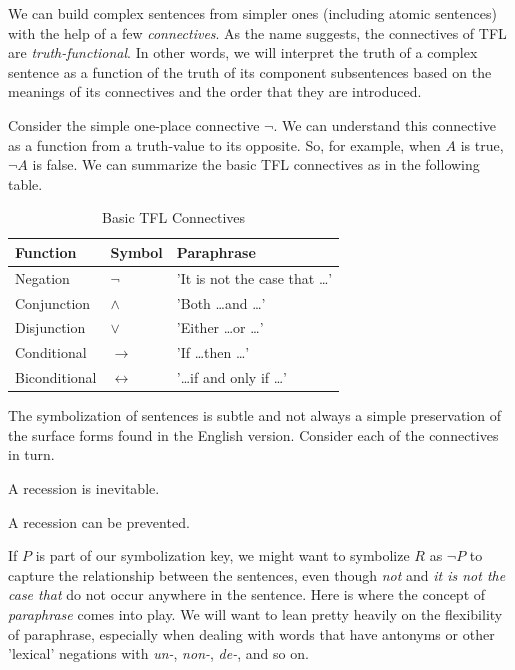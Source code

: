 We can build complex sentences from simpler ones (including atomic sentences)
with the help of a few \emph{connectives}. As the name suggests, the
connectives of TFL are \emph{truth-functional}. In other words, we will
interpret the truth of a complex sentence as a function of the truth of its
component subsentences based on the meanings of its connectives and the order
that they are introduced.

Consider the simple one-place connective $\lnot$. We can understand this
connective as a function from a truth-value to its opposite. So, for example,
when $A$ is true, $\lnot A$ is false. We can summarize the basic TFL
connectives as in the following table.

\begin{table}[h]
\centering
\begin{tabular}{|l|l|l|}
\hline
\textbf{Function} & \textbf{Symbol} & \textbf{Paraphrase} \\
\hline
Negation & $\lnot$ & 'It is not the case that \dots' \\
Conjunction & $\land$ & 'Both \dots and \dots' \\
Disjunction & $\lor$ & 'Either \dots or \dots' \\
Conditional & $\rightarrow$ & 'If \dots then \dots' \\
Biconditional & $\leftrightarrow$ & '\dots if and only if \dots' \\
\hline
\end{tabular}
\caption{Basic TFL Connectives}
\label{tab:basic-tfl-connectives}
\end{table}

The symbolization of sentences is subtle and not always a simple preservation
of the surface forms found in the English version. Consider each of the
connectives in turn.

\begin{argument}
\item[R:] A recession is inevitable.
\item[P:] A recession can be prevented.  
\end{argument}

If $P$ is part of our symbolization key, we might want to symbolize $R$ as
$\lnot P$ to capture the relationship between the sentences, even though
\emph{not} and \emph{it is not the case that} do not occur anywhere in
the sentence. Here is where the concept of \emph{paraphrase} comes into
play. We will want to lean pretty heavily on the flexibility of paraphrase,
especially when dealing with words that have antonyms or other 'lexical'
negations with \emph{un-}, \emph{non-}, \emph{de-}, and so on. 

